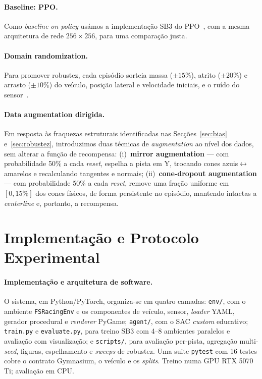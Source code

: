 \documentclass[runningheads]{llncs}
\begin{document}
\paragraph{Baseline: PPO.} Como \textit{baseline} \textit{on-policy} usámos a implementação SB3 do PPO~\cite{schulman2017}, com a mesma arquitetura de rede $256{\times}256$, para uma comparação justa.

\paragraph{Domain randomization.} Para promover robustez, cada episódio sorteia massa ($\pm 15\%$), atrito ($\pm 20\%$) e arrasto ($\pm 10\%$) do veículo, posição lateral e velocidade iniciais, e o ruído do sensor~\cite{tobin2017,ulrich2024}.

\paragraph{Data augmentation dirigida.} Em resposta às fraquezas estruturais identificadas nas Secções~\ref{sec:bias} e~\ref{sec:robustez}, introduzimos duas técnicas de \textit{augmentation} ao nível dos dados, sem alterar a função de recompensa: (i)~\textbf{mirror augmentation} --- com probabilidade 50\% a cada \textit{reset}, espelha a pista em Y, trocando cones azuis$\leftrightarrow$amarelos e recalculando tangentes e normais; (ii)~\textbf{cone-dropout augmentation} --- com probabilidade 50\% a cada \textit{reset}, remove uma fração uniforme em $[0,15\%]$ dos cones físicos, de forma persistente no episódio, mantendo intactas a \textit{centerline} e, portanto, a recompensa.

\section{Implementação e Protocolo Experimental}

\paragraph{Implementação e arquitetura de software.} O sistema, em Python/PyTorch, organiza-se em quatro camadas: \texttt{env/}, com o ambiente \texttt{FSRacingEnv} e os componentes de veículo, sensor, \textit{loader} YAML, gerador procedural e \textit{renderer} PyGame; \texttt{agent/}, com o SAC \textit{custom} educativo; \texttt{train.py} e \texttt{evaluate.py}, para treino SB3 com 4--8 ambientes paralelos e avaliação com visualização; e \texttt{scripts/}, para avaliação per-pista, agregação multi-\textit{seed}, figuras, espelhamento e \textit{sweeps} de robustez. Uma suite \texttt{pytest} com 16 testes cobre o contrato Gymnasium, o veículo e os \textit{splits}. Treino numa GPU RTX 5070\,Ti; avaliação em CPU.
\end{document}
